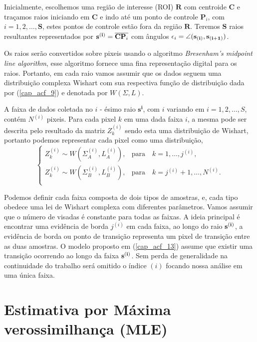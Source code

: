 Inicialmente, escolhemos uma região de interesse (ROI) $\mathbf{R}$ com centroide $\mathbf{C}$ e traçamos raios iniciando em $\mathbf{C}$ e indo até um ponto de controle $\mathbf{P}_i$, com $i=1,2,\dots, \mathbf{S}$, estes pontos de controle estão fora da região $\mathbf{R}$. Teremos $\mathbf{S}$ raios resultantes representados por ${\bf s^{(i)}}=\overline{\mathbf{CP}_i}$ com ângulos $\epsilon_{i}=\angle ({\bf s_{(i)}},{\bf s_{(i+1)}})$. 

Os raios serão convertidos sobre pixeis usando o algoritmo {\it Bresenham's midpoint line algorithm}, esse algoritmo fornece uma fina representação digital para os raios. Portanto, em cada raio vamos assumir que os dados seguem uma distribuição complexa Wishart com sua respectiva função de distribuição dada por (\ref{cap_acf_9}) e denotada por $W(\Sigma,L)$.

A faixa de dados coletada no $\mathit{i}$ - ésimo raio $\mathbf{s^{i}}$, com $i$ variando em $i=1,2,\dots, S$, contém $N^{(i)}$ pixeis. Para cada pixel $\mathit{k}$ em uma dada faixa $\mathit{i}$, a mesma pode ser descrita pelo resultado da matriz $Z_{k}^{(i)}$ sendo esta uma distribuição de Wishart, portanto podemos representar cada pixel como uma distribuição,  
\begin{equation}\label{cap_acf_13}
 \left\{
\begin{array}{cl}
	Z_{k}^{(i)}\sim W(\Sigma_{A}^{(i)},L_{A}^{(i)}),& \mbox{para}\quad k=1,\dots,j^{(i)} , \\
	Z_{k}^{(i)}\sim W(\Sigma_{B}^{(i)},L_{B}^{(i)}),& \mbox{para}\quad k=j^{(i)} + 1,\dots,N^{(i)}.  \\
\end{array}
\right.
\end{equation}

Podemos definir cada faixa composta de dois tipos de amostras, e, cada tipo obedece uma lei de Wishart complexa com diferentes parâmetros. Vamos assumir que o número de visadas é constante para todas as faixas. A ideia principal é encontrar uma evidência de borda $j^{(i)}$ em cada faixa, ao longo do raio ${\bf s^{(i)}}$, a evidência de borda ou ponto de transição representa um pixel de transição entre as duas amostras. O modelo proposto em (\ref{cap_acf_13}) assume que existir uma transição ocorrendo ao longo da faixa $\bf s^{(i)}$. Sem perda de generalidade na continuidade do trabalho será omitido o índice $(i)$ focando nossa análise em uma única faixa.
\section{Estimativa por Máxima verossimilhança (\textbf{MLE})}\label{cap_acf_sec3}

